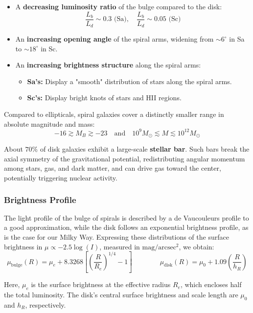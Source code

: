 \begin{itemize}
    \item A \textbf{decreasing luminosity ratio} of the bulge compared to the disk:
    $$
    \frac{L_b}{L_d} \sim 0.3 \text{ (Sa)}, \quad \frac{L_b}{L_d} \sim 0.05 \text{ (Sc)}
    $$
    
    \item An \textbf{increasing opening angle} of the spiral arms, widening from $\sim 6^\circ$ in Sa to $\sim 18^\circ$ in Sc.
    
    \item An \textbf{increasing brightness structure} along the spiral arms:
    \begin{itemize}
        \item \textbf{Sa's:} Display a "smooth" distribution of stars along the spiral arms.
        \item \textbf{Sc's:} Display bright knots of stars and HII regions.
    \end{itemize}
\end{itemize}

Compared to ellipticals, spiral galaxies cover a distinctly smaller range in absolute magnitude and mass:
$$
-16 \gtrsim M_B \gtrsim -23 \quad \text{and} \quad 10^9 M_\odot \lesssim M \lesssim 10^{12} M_\odot
$$

About $70\%$ of disk galaxies exhibit a large-scale \textbf{stellar bar}. Such bars break the axial symmetry of the gravitational potential, redistributing angular momentum among stars, gas, and dark matter, and can drive gas toward the center, potentially triggering nuclear activity.

\subsubsection{Brightness Profile}

The light profile of the bulge of spirals is described by a de Vaucouleurs profile to a good approximation, while the disk follows an exponential brightness profile, as is the case for our Milky Way. Expressing these distributions of the surface brightness in $\mu \propto -2.5\log(I)$, measured in $\mathrm{mag/arcsec^2}$, we obtain:
$$
\mu_\mathrm{bulge}(R) = \mu_e + 8.3268\left[\left(\frac{R}{R_e}\right)^{1/4} - 1\right]
\qquad \qquad
\mu_\mathrm{disk}(R) = \mu_0 + 1.09\left(\frac{R}{h_R}\right)
$$

Here, $\mu_e$ is the surface brightness at the effective radius $R_e$, which encloses half the total luminosity. The disk's central surface brightness and scale length are $\mu_0$ and $h_R$, respectively.

